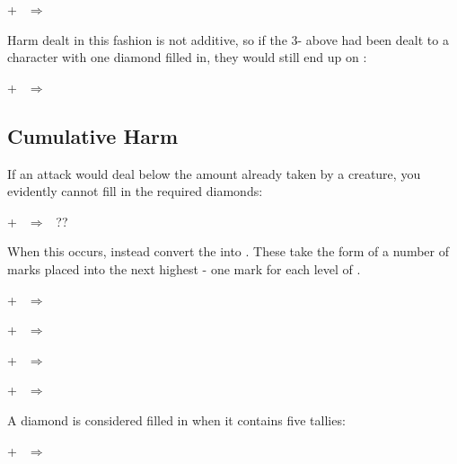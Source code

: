 \begin{center}
	 + $~~\Longrightarrow~~$
\end{center}

Harm dealt in this fashion is not additive, so if the 3- above had been dealt to a character with one diamond filled in, they would still end up on :

\begin{center}
	 + $~~\Longrightarrow~~$
\end{center}


\subsection{Cumulative Harm}

If an attack would deal  below the amount already taken by a creature, you evidently cannot fill in the required diamonds:

\begin{center}
	 + $~~\Longrightarrow~~$ ??
\end{center}

When this occurs, instead convert the  into . These take the form of a number of marks placed into the next highest  - one mark for each level of . 

\begin{center}
	 + $~~\Longrightarrow~~$
	
	 + $~~\Longrightarrow~~$
	
	 + $~~\Longrightarrow~~$
	
	 + $~~\Longrightarrow~~$
\end{center}

A diamond is considered filled in when it contains five tallies:
\begin{center}
	 + $~~\Longrightarrow~~$
\end{center}

